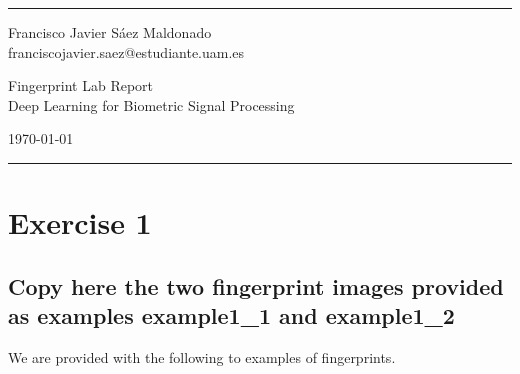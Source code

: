 \documentclass[a4paper]{article}
\begin{document}

\fancyhead[C]{}
\hrule \medskip %
\begin{minipage}{0.295\textwidth}
\raggedright
\footnotesize
Francisco Javier Sáez Maldonado \hfill\\
franciscojavier.saez@estudiante.uam.es
\hfill\\
\end{minipage}
\begin{minipage}{0.4\textwidth}
\centering
\large
Fingerprint Lab Report\\
\normalsize
Deep Learning for Biometric Signal Processing\\
\end{minipage}
\begin{minipage}{0.295\textwidth}
\raggedleft
\today\hfill\\
\end{minipage}
\medskip\hrule

\section{Exercise 1}
\subsection{ Copy here the two fingerprint images provided as examples example1\_1 and example1\_2}

We are provided with the following to examples of fingerprints.
\end{document}
